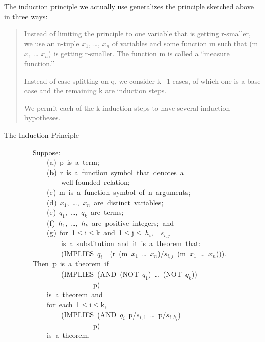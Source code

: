 \documentclass[11pt]{book}
\newenvironment{pubasis}{\begin{flushleft}\ttfamily\small}{\normalsize\rmfamily\end{flushleft}}
\newenvironment{pubcrown}{\begin{quote}}{\end{quote}}
\begin{document}
The induction principle we actually use generalizes the principle sketched above in three ways:~~
\begin{pubcrown}
Instead of
limiting the principle to one variable that is getting r-smaller, we use an n-tuple $x_{1}$, \ldots{}, $x_{n}$ of variables and  some function m
such that (m $x_{1}$ \ldots{} $x_{n}$) is getting r-smaller.  The function m
is called a ``measure function.''  

Instead of case splitting
on q, we consider k+1 cases,  of which one is a base case and the
remaining k are induction steps.

We 
permit each of the k induction steps to have several induction
hypotheses.
\end{pubcrown}
\par\pagebreak[0]\hrulefill\nopagebreak\par
\begin{center}
The Induction Principle
\end{center}
\begin{pubasis}
~~~~~~~~Suppose:\\

~~~~~~~~~~~~(a)~p~is~a~term;\\
~~~~~~~~~~~~(b)~r~is~a~function~symbol~that~denotes~a\\
~~~~~~~~~~~~~~~~well-founded~relation;\\
~~~~~~~~~~~~(c)~m~is~a~function~symbol~of~n~arguments;\\
~~~~~~~~~~~~(d)~$x_{1}$,~\ldots{},~$x_{n}$~are~distinct~variables;\\
~~~~~~~~~~~~(e)~$q_{1}$,~\ldots{},~$q_{k}$~are~terms;\\
~~~~~~~~~~~~(f)~$h_{1}$,~\ldots{},~$h_{k}$~are~positive~integers;~and\\
~~~~~~~~~~~~(g)~for~1$\leq$i$\leq$k~and~1$\leq$j$\leq~h_{i}$,~~$s_{i,j}$\\
~~~~~~~~~~~~~~~~is~a~substitution~and~it~is~a~theorem~that:\\

~~~~~~~~~~~~~~~~(IMPLIES~$q_{i}$~~(r~(m~$x_{1}$~\ldots{}~$x_{n}$)/$s_{i,j}$~(m~$x_{1}$~\ldots{}~$x_{n}$))).\\

~~~~~~~~Then~p~is~a~theorem~if\\

~~~~~~~~~~~~~~~~(IMPLIES~(AND~(NOT~$q_{1}$)~\ldots{}~(NOT~$q_{k}$))\\
~~~~~~~~~~~~~~~~~~~~~~~~~p)\\

~~~~~~~~~~~~is~a~theorem~and\\

~~~~~~~~~~~~for~each~1$\leq$i$\leq$k,\\

~~~~~~~~~~~~~~~~(IMPLIES~(AND~$q_{i}$~p/$s_{i,1}$~\ldots{}~p/$s_{i,h_{i}}$)\\
~~~~~~~~~~~~~~~~~~~~~~~~~p)\\

~~~~~~~~~~~~is~a~theorem.\\
\end{pubasis}
\end{document}
